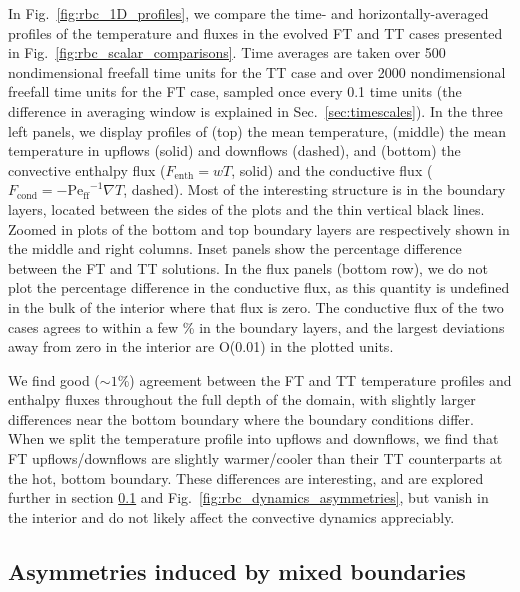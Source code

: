 \documentclass[aps, pre, onecolumn, nofootinbib, notitlepage, groupedaddress, amsfonts, amssymb, amsmath, longbibliography, superscriptaddress]{revtex4-1}
\newcommand{\grad}{\ensuremath{\nabla}}
\newcommand{\Peff}{\ensuremath{\text{Pe}_{\text{ff}}}}
\begin{document}
In Fig.~\ref{fig:rbc_1D_profiles}, we compare the time- and horizontally-averaged profiles of the temperature and fluxes in the evolved FT and TT cases presented in Fig.~\ref{fig:rbc_scalar_comparisons}.
Time averages are taken over 500 nondimensional freefall time units for the TT case and over 2000 nondimensional freefall time units for the FT case, sampled once every 0.1 time units (the difference in averaging window is explained in Sec.~\ref{sec:timescales}).
In the three left panels, we display profiles of (top) the mean temperature, (middle) the mean temperature in upflows (solid) and downflows (dashed), and (bottom) the convective enthalpy flux ($F_{\text{enth}} = wT$, solid) and the conductive flux ($F_{\text{cond}} = -\Peff^{-1}\grad T$, dashed).
Most of the interesting structure is in the boundary layers, located between the sides of the plots and the thin vertical black lines.
Zoomed in plots of the bottom and top boundary layers are respectively shown in the middle and right columns.
Inset panels show the percentage difference between the FT and TT solutions.
In the flux panels (bottom row), we do not plot the percentage difference in the conductive flux, as this quantity is undefined in the bulk of the interior where that flux is zero.
The conductive flux of the two cases agrees to within a few \% in the boundary layers, and the largest deviations away from zero in the interior are O(0.01) in the plotted units. 

We find good ($\sim 1\%$) agreement between the FT and TT temperature profiles and enthalpy fluxes throughout the full depth of the domain, with slightly larger differences near the bottom boundary where the boundary conditions differ.
When we split the temperature profile into upflows and downflows, we find that FT upflows/downflows are slightly warmer/cooler than their TT counterparts at the hot, bottom boundary.
These differences are interesting, and are explored further in section \ref{sec:asymmetries} and Fig.~\ref{fig:rbc_dynamics_asymmetries}, but vanish in the interior and do not likely affect the convective dynamics appreciably.



\subsection{Asymmetries induced by mixed boundaries}
\label{sec:asymmetries}
\end{document}
